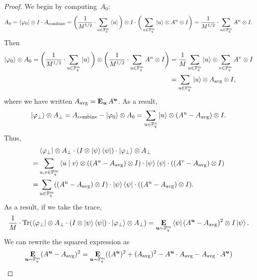 \begin{proof}
We begin by computing~$A_0$:
\begin{equation*}
A_0
= \bra{\varphi_0} \otimes I \cdot A_{\mathrm{combine}}
= \bigg(\frac{1}{M^{1/2}} \cdot \sum_{u \in \mathbb F_q^m} \bra{u}\bigg) \otimes I \cdot \bigg(\sum_{u \in \mathbb F_q^m} \ket{u} \otimes A^u \otimes I\bigg)
= \frac{1}{M^{1/2}} \cdot \sum_{u \in \mathbb F_q^m} A^u \otimes I.
\end{equation*}
Then
\begin{align*}
\ket{\varphi_0} \otimes A_0
= \bigg(\frac{1}{M^{1/2}} \cdot \sum_{u \in \mathbb F_q^m} \ket{u}\bigg)\otimes \bigg(\frac{1}{M^{1/2}} \cdot \sum_{u \in \mathbb F_q^m} A^u \otimes I\bigg)
&= \frac{1}{M} \sum_{u \in \mathbb F_q^m} \ket{u} \otimes \sum_{v \in \mathbb F_q^m} A^v \otimes I\\
&= \sum_{u \in \mathbb F_q^m} \ket{u} \otimes A_{\mathrm{avg}} \otimes I,
\end{align*}
where we have written $A_{\mathrm{avg}} = \mathop{\bf E\/}_{\boldsymbol{u}} A^{\boldsymbol{u}}$.
As a result,
\begin{equation*}
\ket{\varphi_{\perp}} \otimes A_{\perp}
= A_{\mathrm{combine}} - \ket{\varphi_0} \otimes A_0
= \sum_{u \in \mathbb F_q^n} \ket{u} \otimes (A^u - A_{\mathrm{avg}}) \otimes I.
\end{equation*}
Thus,
\begin{align*}
&\bra{\varphi_{\perp}} \otimes A_{\perp} \cdot (I \otimes \ket{\psi}\bra{\psi}) \cdot \ket{\varphi_{\perp}} \otimes A_{\perp}\\
=&\sum_{u, v \in \mathbb F_q^m} \braket{u \mid v} \otimes ((A^u - A_{\mathrm{avg}}) \otimes I) \cdot \ket{\psi}\bra{\psi} \cdot ((A^v - A_{\mathrm{avg}}) \otimes I)\\
=&\sum_{u \in \mathbb F_q^m}  ((A^u - A_{\mathrm{avg}}) \otimes I) \cdot \ket{\psi}\bra{\psi} \cdot ((A^u - A_{\mathrm{avg}}) \otimes I).
\end{align*}
As a result, if we take the trace,
\begin{equation}\label{eq:just-took-trace}
\frac{1}{M} \cdot \mathrm{Tr}(\bra{\varphi_{\perp}} \otimes A_{\perp} \cdot (I \otimes \ket{\psi}\bra{\psi}) \cdot \ket{\varphi_{\perp}} \otimes A_{\perp})
= \mathop{\bf E\/}_{\boldsymbol{u} \sim \mathbb F_q^m} \bra{\psi} (A^{\boldsymbol{u}} - A_{\mathrm{avg}})^2 \otimes I \ket{\psi}.
\end{equation}
We can rewrite the squared expression as
\begin{align*}
\E_{\bu \sim \F_q^m}(A^{\bu} - A_{\mathrm{avg}})^2
&= \E_{\bu \sim \F_q^m}((A^{\bu})^2 + (A_{\mathrm{avg}})^2 - A^{\bu} \cdot A_{\mathrm{avg}} - A_{\mathrm{avg}} \cdot A^{\bu})\\

\end{align*}
\end{proof}
